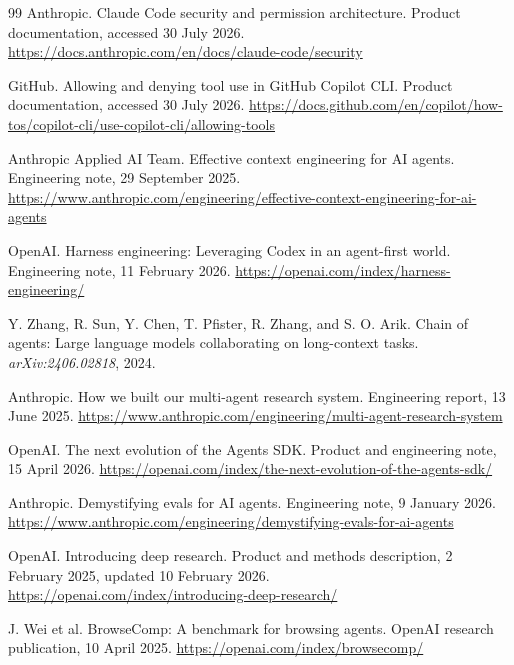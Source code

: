 \documentclass[11pt,a4paper]{article}
\begin{document}
\begin{thebibliography}{99}
Anthropic.
\newblock Claude Code security and permission architecture.
\newblock Product documentation, accessed 30 July 2026. \url{https://docs.anthropic.com/en/docs/claude-code/security}

GitHub.
\newblock Allowing and denying tool use in GitHub Copilot CLI.
\newblock Product documentation, accessed 30 July 2026. \url{https://docs.github.com/en/copilot/how-tos/copilot-cli/use-copilot-cli/allowing-tools}

Anthropic Applied AI Team.
\newblock Effective context engineering for AI agents.
\newblock Engineering note, 29 September 2025. \url{https://www.anthropic.com/engineering/effective-context-engineering-for-ai-agents}

OpenAI.
\newblock Harness engineering: Leveraging Codex in an agent-first world.
\newblock Engineering note, 11 February 2026. \url{https://openai.com/index/harness-engineering/}

Y. Zhang, R. Sun, Y. Chen, T. Pfister, R. Zhang, and S. O. Arik.
\newblock Chain of agents: Large language models collaborating on long-context tasks.
\newblock \emph{arXiv:2406.02818}, 2024.

Anthropic.
\newblock How we built our multi-agent research system.
\newblock Engineering report, 13 June 2025. \url{https://www.anthropic.com/engineering/multi-agent-research-system}

OpenAI.
\newblock The next evolution of the Agents SDK.
\newblock Product and engineering note, 15 April 2026. \url{https://openai.com/index/the-next-evolution-of-the-agents-sdk/}

Anthropic.
\newblock Demystifying evals for AI agents.
\newblock Engineering note, 9 January 2026. \url{https://www.anthropic.com/engineering/demystifying-evals-for-ai-agents}

OpenAI.
\newblock Introducing deep research.
\newblock Product and methods description, 2 February 2025, updated 10 February 2026. \url{https://openai.com/index/introducing-deep-research/}

J. Wei et al.
\newblock BrowseComp: A benchmark for browsing agents.
\newblock OpenAI research publication, 10 April 2025. \url{https://openai.com/index/browsecomp/}


\end{thebibliography}
\end{document}
